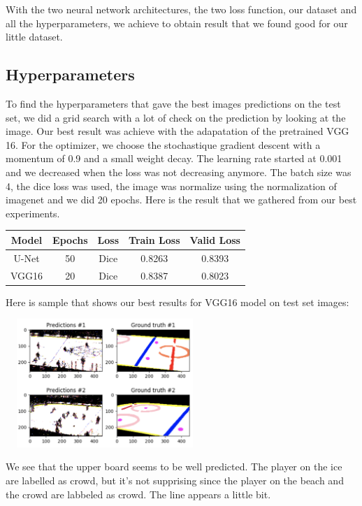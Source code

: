 With the two neural network architectures, the two loss function, our dataset and all the hyperparameters, we achieve to obtain result that we found good for our little dataset. 

\subsection{Hyperparameters}

To find the hyperparameters that gave the best images predictions on the test set, we did a grid search with a lot of check on the prediction by looking at the image. Our best result was achieve with the adapatation of the pretrained VGG 16. For the optimizer, we choose the stochastique gradient descent with a momentum of 0.9 and a small weight decay. The learning rate started at 0.001 and we decreased when the loss was not decreasing anymore. The batch size was 4, the dice loss was used, the image was normalize using the normalization of imagenet and we did 20 epochs. Here is the result that we gathered from our best experiments.
\vspace{2mm}
\setlength{\tabcolsep}{1mm}
\begin{tabular}{c c c c c}
	\toprule
	Model & Epochs & Loss & Train Loss & Valid Loss \\
	\midrule
	U-Net & 50 & Dice & 0.8263 & 0.8393 \\
	VGG16 & 20 & Dice & 0.8387 & 0.8023 \\
\end{tabular}

\vspace{1mm}

 Here is sample that shows our best results for VGG16 model on test set images:

\vspace{1mm}
\begin{center}
	\includegraphics[width=7.5cm,height=4.86cm]{figures/test-9-class.png}
\end{center}

We see that the upper board seems to be well predicted. The player on the ice are labelled as crowd, but it's not supprising since the player on the beach and the crowd are labbeled as crowd. The line appears a little bit.
